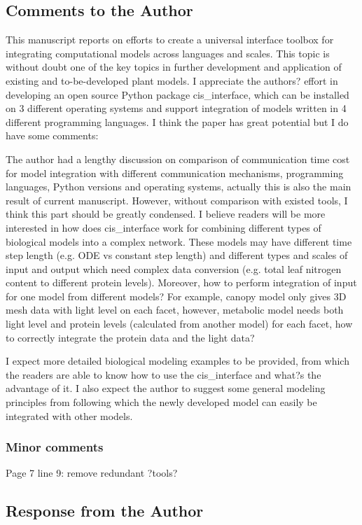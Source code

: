 \documentclass[11pt]{article}
\newcommand{\cmark}{\ding{51}}%
\newcommand{\done}{\rlap{$\square$}{\raisebox{2pt}{\large\hspace{1pt}\cmark}}%
\hspace{-2.5pt}}
\begin{document}
\subsection{Comments to the Author}
This manuscript reports on efforts to create a universal interface toolbox for integrating computational models across languages and scales. This topic is without doubt one of the key topics in further development and application of existing and to-be-developed plant models. I appreciate the authors? effort in developing an open source Python package cis{\_}interface, which can be installed on 3 different operating systems and support integration of models written in 4 different programming languages. I think the paper has great potential but I do have some comments:
\begin{todolist}
\item The author had a lengthy discussion on comparison of communication time cost for model integration with different communication mechanisms, programming languages, Python versions and operating systems, actually this is also the main result of current manuscript. However, without comparison with existed tools, I think this part should be greatly condensed. I believe readers will be more interested in how does cis{\_}interface work for combining different types of biological models into a complex network. These models may have different time step length (e.g. ODE vs constant step length) and different types and scales of input and output which need complex data conversion (e.g. total leaf nitrogen content to different protein levels). Moreover, how to perform integration of input for one model from different models? For example, canopy model only gives 3D mesh data with light level on each facet, however, metabolic model needs both light level and protein levels (calculated from another model) for each facet, how to correctly integrate the protein data and the light data?
\item I expect more detailed biological modeling examples to be provided, from which the readers are able to know how to use the cis{\_}interface and what?s the advantage of it. I also expect the author to suggest some general modeling principles from following which the newly developed model can easily be integrated with other models. 
\end{todolist}

\subsubsection{Minor comments}
\begin{todolist}
\item[\done] Page 7 line 9: remove redundant ?tools?
\end{todolist}

\subsection{Response from the Author}
\end{document}
